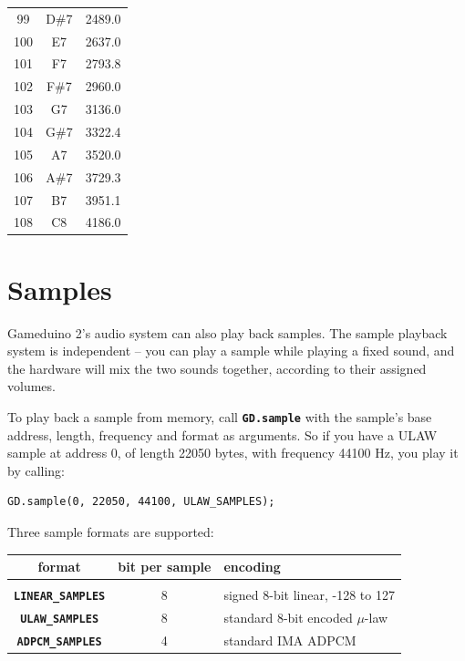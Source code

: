 \documentclass[10pt]{book}
\newcommand{\gdtwos}{Gameduino 2's }
\newcommand{\mach}[1]{\texttt{\textbf{#1}}}
\begin{document}
\begin{spacing}{0.99}
\begin{supertabular}{ccc}
99  & D\#7 & 2489.0 \\
100 & E7  & 2637.0 \\
101 & F7  & 2793.8 \\
102 & F\#7 & 2960.0 \\
103 & G7  & 3136.0 \\
104 & G\#7 & 3322.4 \\
105 & A7  & 3520.0 \\
106 & A\#7 & 3729.3 \\
107 & B7  & 3951.1 \\
108 & C8  & 4186.0 \\
\end{supertabular}
\end{spacing}
\onecolumn
\normalsize

\section{Samples}

\gdtwos audio system can also play back samples.
The sample playback system is independent -- you can play a sample while playing a fixed sound, and the
hardware will mix the two sounds together, according to their assigned volumes.

To play back a sample from memory, call \mach{GD.sample} with the
sample's base address, length, frequency and format as arguments.
So if you have a ULAW sample at address 0, of length 22050 bytes,
with frequency 44100 Hz, you play it by calling:

\begin{framed}
\begin{verbatim}
GD.sample(0, 22050, 44100, ULAW_SAMPLES);
\end{verbatim}
\end{framed}

Three sample formats are supported:

\vspace{10pt}
\begin{tabular}{ccl}
format & bit per sample & encoding \\
\hline \\
\mach{LINEAR\_SAMPLES} & 8 & signed 8-bit linear, -128 to 127 \\
\mach{ULAW\_SAMPLES} & 8 & standard 8-bit encoded $\mu$-law \\
\mach{ADPCM\_SAMPLES} & 4 & standard IMA ADPCM \\
\end{tabular}
\vspace{10pt}
\end{document}
